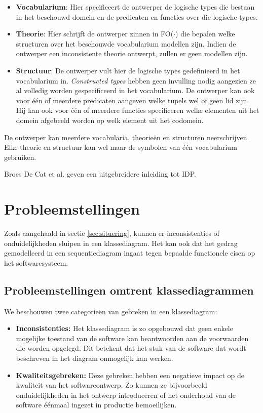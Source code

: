 \begin{itemize}
	\item \textbf{Vocabularium}: Hier specificeert de ontwerper de logische types die bestaan in het beschouwd domein en de predicaten en functies over die logische types.
	\item \textbf{Theorie}: Hier schrijft de ontwerper zinnen in FO($\cdot$) die bepalen welke structuren over het beschouwde vocabularium modellen zijn. Indien de ontwerper een inconsistente theorie ontwerpt, zullen er geen modellen zijn.
	\item \textbf{Structuur}: De ontwerper vult hier de logische types gedefinieerd in het vocabularium in. \textit{Constructed types} hebben geen invulling nodig aangezien ze al volledig worden gespecificeerd in het vocabularium. De ontwerper kan ook voor \'e\'en of meerdere predicaten aangeven welke tupels wel of geen lid zijn. Hij kan ook voor \'e\'en of meerdere functies specificeren welke elementen uit het domein afgebeeld worden op welk element uit het codomein.
\end{itemize}

De ontwerper kan meerdere vocabularia, theorie\"en en structuren neerschrijven. Elke theorie en structuur kan wel maar de symbolen van \'e\'en vocabularium gebruiken.

Broes De Cat et al.\cite{DeCatBroes2014PLaa} geven een uitgebreidere inleiding tot IDP.

\section{Probleemstellingen}\label{sec:research-q}

Zoals aangehaald in sectie \ref{sec:situering}, kunnen er inconsistenties of onduidelijkheden sluipen in een klassediagram. Het kan ook dat het gedrag gemodelleerd in een sequentiediagram ingaat tegen bepaalde functionele eisen op het softwaresysteem.

\subsection{Probleemstellingen omtrent klassediagrammen}

We beschouwen twee categorie\"en van gebreken in een klassediagram:

\begin{itemize}
	\item \textbf{Inconsistenties:} Het klassediagram is zo opgebouwd dat geen enkele mogelijke toestand van de software kan beantwoorden aan de voorwaarden die worden opgelegd. Dit betekent dat het stuk van de software dat wordt beschreven in het diagram onmogelijk kan werken.
	\item \textbf{Kwaliteitsgebreken:} Deze gebreken hebben een negatieve impact op de kwaliteit van het softwareontwerp. Zo kunnen ze bijvoorbeeld onduidelijkheden in het ontwerp introduceren of het onderhoud van de software \'e\'enmaal ingezet in productie bemoeilijken.
\end{itemize}

